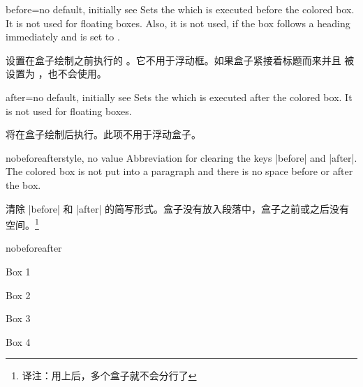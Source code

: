 \begin{docTcbKey}{before}{=}{no default, initially see }
Sets the  which is executed before the colored box.
It is not used for floating boxes.
Also, it is not used, if the box follows a heading immediately
and  is set to .

设置在盒子绘制之前执行的 。它不用于浮动框。如果盒子紧接着标题而来并且  被设置为 ，也不会使用。

\end{docTcbKey}

\begin{docTcbKey}{after}{=}{no default, initially see }
Sets the  which is executed after the colored box.
It is not used for floating boxes.

将在盒子绘制后执行。此项不用于浮动盒子。
\end{docTcbKey}


\begin{docTcbKey}{nobeforeafter}{}{style, no value}
Abbreviation for clearing the keys |before| and |after|. The colored box
is not put into a paragraph and there is no space before or after the box.


清除 |before| 和 |after| 的简写形式。盒子没有放入段落中，盒子之前或之后没有空间。\footnote{译注：用上后，多个盒子就不会分行了}
\begin{exdispExample}{nobeforeafter}
\begin{tcolorbox}[myone,title=Box 1]Box 1\end{tcolorbox}%
\begin{tcolorbox}[myone,title=Box 2]Box 2\end{tcolorbox}%
\begin{tcolorbox}[myone,title=Box 3]Box 3\end{tcolorbox}%
\begin{tcolorbox}[myone,title=Box 4]Box 4\end{tcolorbox}
\end{exdispExample}
\end{docTcbKey}



